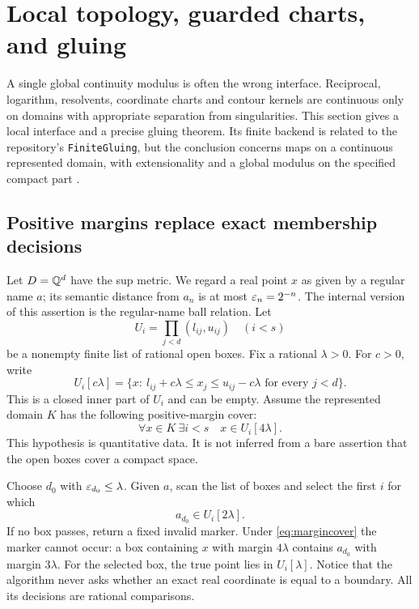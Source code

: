 \section{Local topology, guarded charts, and gluing}\label{sec:gluing}

A single global continuity modulus is often the wrong interface. Reciprocal,
logarithm, resolvents, coordinate charts and contour kernels are continuous only
on domains with appropriate separation from singularities. This section gives
a local interface and a precise gluing theorem. Its finite backend is related
to the repository's \texttt{FiniteGluing}, but the conclusion concerns maps on
a continuous represented domain, with extensionality and a global modulus
on the specified compact part \cite{repo-gluing,repo-guard}.

\subsection{Positive margins replace exact membership decisions}

Let $D=\mathbb Q^d$ have the sup metric. We regard a real point $x$ as given by a
regular name $a$; its semantic distance from $a_n$ is at most $\varepsilon_n=2^{-n}$.
The internal version of this assertion is the regular-name ball relation.
Let
\[
 U_i=\prod_{j<d}(l_{ij},u_{ij})\quad (i<s)
\]
be a nonempty finite list of rational open boxes. Fix a rational $\lambda>0$.
For $c>0$, write
\[
 U_i[c\lambda]=\{x:\ l_{ij}+c\lambda\le x_j\le u_{ij}-c\lambda
                         \text{ for every }j<d\}.
\]
This is a closed inner part of $U_i$ and can be empty. Assume the represented
domain $K$ has the following positive-margin cover:
\begin{equation}\label{eq:margincover}
        \forall x\in K\ \exists i<s\quad x\in U_i[4\lambda].
\end{equation}
This hypothesis is quantitative data. It is not inferred from a bare assertion
that the open boxes cover a compact space.

Choose $d_0$ with $\varepsilon_{d_0}\le\lambda$. Given $a$, scan the list of boxes
and select the first $i$ for which
\begin{equation}\label{eq:safeguard}
              a_{d_0}\in U_i[2\lambda].
\end{equation}
If no box passes, return a fixed invalid marker. Under
\eqref{eq:margincover} the marker cannot occur: a box containing $x$ with
margin $4\lambda$ contains $a_{d_0}$ with margin $3\lambda$.
For the selected box, the true point lies in $U_i[\lambda]$.
Notice that the algorithm never asks whether an exact real coordinate is
equal to a boundary. All its decisions are rational comparisons.

